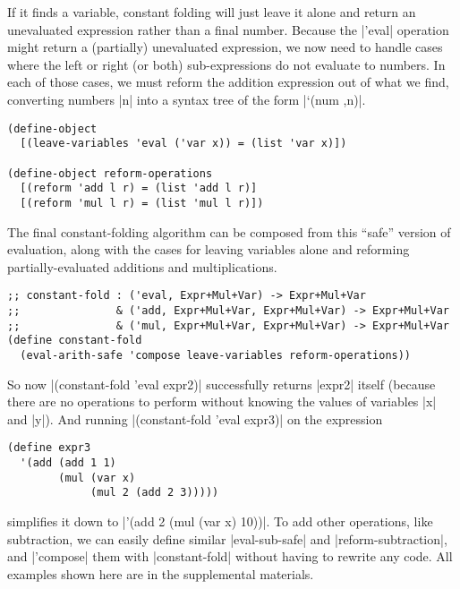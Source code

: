 If it finds a variable, constant folding will just leave it alone and return an unevaluated expression rather than a final number.
Because the \scm|'eval| operation might return a (partially) unevaluated expression, we now need to handle cases where the left or right (or both) sub-expressions do not evaluate to numbers.
In each of those cases, we must reform the addition expression out of what we find, converting numbers \scm|n| into a syntax tree of the form \scm|`(num ,n)|.
\begin{verbatim}
(define-object
  [(leave-variables 'eval ('var x)) = (list 'var x)])

(define-object reform-operations
  [(reform 'add l r) = (list 'add l r)]
  [(reform 'mul l r) = (list 'mul l r)])
\end{verbatim}
The final constant-folding algorithm can be composed from this ``safe'' version of evaluation, along with the cases for leaving variables alone and reforming partially-evaluated additions and multiplications.
\begin{verbatim}
;; constant-fold : ('eval, Expr+Mul+Var) -> Expr+Mul+Var
;;               & ('add, Expr+Mul+Var, Expr+Mul+Var) -> Expr+Mul+Var
;;               & ('mul, Expr+Mul+Var, Expr+Mul+Var) -> Expr+Mul+Var
(define constant-fold
  (eval-arith-safe 'compose leave-variables reform-operations))
\end{verbatim}
So now \scm|(constant-fold 'eval expr2)| successfully returns \scm|expr2| itself (because there are no operations to perform without knowing the values of variables \scm|x| and \scm|y|).
And running \scm|(constant-fold 'eval expr3)| on the expression
\begin{verbatim}
(define expr3
  '(add (add 1 1)
        (mul (var x)
             (mul 2 (add 2 3)))))
\end{verbatim}
simplifies it down to \scm|'(add 2 (mul (var x) 10))|.
To add other operations, like subtraction, we can easily define similar \scm|eval-sub-safe| and \scm|reform-subtraction|, and \scm|'compose| them with \scm|constant-fold| without having to rewrite any code.
All examples shown here are in the supplemental materials.

